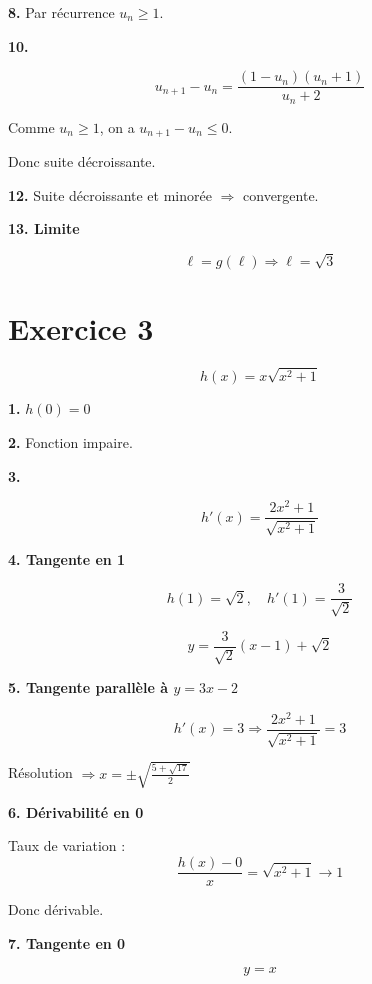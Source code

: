 \documentclass[11pt,a4paper]{article}
\begin{document}
\bigskip

\textbf{8.} Par récurrence $u_n\ge1$.

\bigskip

\textbf{10.}

\[
u_{n+1}-u_n=\frac{(1-u_n)(u_n+1)}{u_n+2}
\]

Comme $u_n\ge1$, on a $u_{n+1}-u_n\le0$.

Donc suite décroissante.

\bigskip

\textbf{12.} Suite décroissante et minorée $\Rightarrow$ convergente.

\bigskip

\textbf{13. Limite}

\[
\ell=g(\ell) \Rightarrow \ell=\sqrt{3}
\]

\bigskip

\section*{Exercice 3}

\[
h(x)=x\sqrt{x^2+1}
\]

\textbf{1.} $h(0)=0$

\bigskip

\textbf{2.} Fonction impaire.

\bigskip

\textbf{3.}

\[
h'(x)=\frac{2x^2+1}{\sqrt{x^2+1}}
\]

\bigskip

\textbf{4. Tangente en 1}

\[
h(1)=\sqrt{2}, \quad h'(1)=\frac{3}{\sqrt{2}}
\]

\[
y=\frac{3}{\sqrt{2}}(x-1)+\sqrt{2}
\]

\bigskip

\textbf{5. Tangente parallèle à $y=3x-2$}

\[
h'(x)=3 \Rightarrow \frac{2x^2+1}{\sqrt{x^2+1}}=3
\]

Résolution $\Rightarrow x=\pm\sqrt{\frac{5+\sqrt{17}}{2}}$

\bigskip

\textbf{6. Dérivabilité en 0}

Taux de variation :
\[
\frac{h(x)-0}{x}=\sqrt{x^2+1}\to1
\]

Donc dérivable.

\bigskip

\textbf{7. Tangente en 0}

\[
y=x
\]
\end{document}
